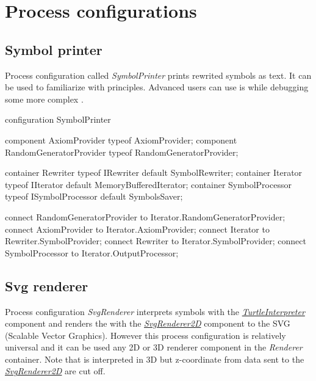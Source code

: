 \section{Process configurations}
\label{sec:stdLibProcessConfigurations}

\subsection{Symbol printer}
\label{sec:stdLibSymbolPrinter}

Process configuration called \emph{SymbolPrinter} prints rewrited symbols as text.
It can be used to familiarize with \lsystem principles.
Advanced users can use is while debugging some more complex \lsystems.

\begin{LsystemBreak}
configuration SymbolPrinter {
	component AxiomProvider typeof AxiomProvider;
	component RandomGeneratorProvider typeof RandomGeneratorProvider;

	container Rewriter typeof IRewriter default SymbolRewriter;
	container Iterator typeof IIterator default MemoryBufferedIterator;
	container SymbolProcessor typeof ISymbolProcessor default SymbolsSaver;

	connect RandomGeneratorProvider	to Iterator.RandomGeneratorProvider;
	connect AxiomProvider to Iterator.AxiomProvider;
	connect Iterator to Rewriter.SymbolProvider;
	connect Rewriter to Iterator.SymbolProvider;
	connect SymbolProcessor to Iterator.OutputProcessor;
}
\end{LsystemBreak}


\subsection{Svg renderer}
\label{configurationSvgRenderer}

Process configuration \emph{SvgRenderer} interprets symbols with the \hyperref[Malsys.Processing.Components.Interpreters.TurtleInterpreter]{\emph{TurtleInterpreter}} component
	and renders the with the \hyperref[Malsys.Processing.Components.Renderers.SvgRenderer2D]{\emph{SvgRenderer2D}} component to the SVG (Scalable Vector Graphics).
However this process configuration is relatively universal and it can be used any 2D or 3D renderer component in the \emph{Renderer} container.
Note that \lsystem is interpreted in 3D but z-coordinate from data sent to the \hyperref[Malsys.Processing.Components.Renderers.SvgRenderer2D]{\emph{SvgRenderer2D}} are cut off.


